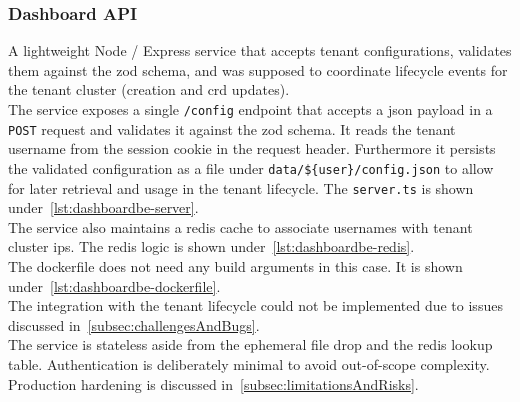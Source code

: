 \documentclass[11pt, a4paper, oneside, listof=totoc]{scrartcl}
\begin{document}
            \subsubsection{Dashboard API}\label{subsubsec:dashboardAPI}
                A lightweight Node / Express service that accepts tenant configurations, validates
                them against the zod schema, and was supposed to coordinate lifecycle events for
                the tenant cluster (creation and \gls{crd} updates).\\
                The service exposes a single \texttt{/config} endpoint that accepts a \gls{json}
                payload in a \texttt{POST} request and validates it against the zod schema.
                It reads the tenant username from the session cookie in the request header.
                Furthermore it persists the validated configuration as a file under
                \texttt{data/\$\{user\}/config.json} to allow for later retrieval and usage in the
                tenant lifecycle.
                The \texttt{server.ts} is shown under~\autoref{lst:dashboardbe-server}.\\
                The service also maintains a redis cache to associate usernames with tenant cluster
                \glspl{ip}.
                The redis logic is shown under~\autoref{lst:dashboardbe-redis}.\\
                The dockerfile does not need any build arguments in this case.
                It is shown under~\autoref{lst:dashboardbe-dockerfile}.\\
                The integration with the tenant lifecycle could not be implemented due to issues
                discussed in~\autoref{subsec:challengesAndBugs}.\\
                The service is stateless aside from the ephemeral file drop and the redis lookup
                table.
                Authentication is deliberately minimal to avoid out-of-scope complexity.
                Production hardening is discussed in~\autoref{subsec:limitationsAndRisks}.
\end{document}
